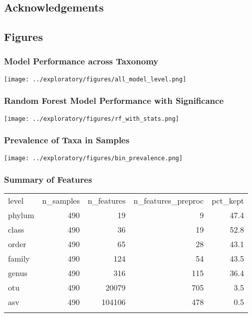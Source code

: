 \documentclass[
]{article}
\begin{document}
\hypertarget{acknowledgements}{%
\subsection{Acknowledgements}\label{acknowledgements}}

\hypertarget{figures}{%
\subsection{Figures}\label{figures}}

\hypertarget{model-performance-across-taxonomy}{%
\subsubsection{Model Performance across
Taxonomy}\label{model-performance-across-taxonomy}}

\texttt{[image: ../exploratory/figures/all\_model\_level.png]}

\hypertarget{random-forest-model-performance-with-significance}{%
\subsubsection{Random Forest Model Performance with
Significance}\label{random-forest-model-performance-with-significance}}

\texttt{[image: ../exploratory/figures/rf\_with\_stats.png]}

\hypertarget{prevalence-of-taxa-in-samples}{%
\subsubsection{Prevalence of Taxa in
Samples}\label{prevalence-of-taxa-in-samples}}

\texttt{[image: ../exploratory/figures/bin\_prevalence.png]}

\hypertarget{summary-of-features}{%
\subsubsection{Summary of Features}\label{summary-of-features}}

\begin{longtable}[]{@{}lrrrr@{}}
\toprule
level & n\_samples & n\_features & n\_features\_preproc &
pct\_kept \\ \addlinespace
\midrule
\endhead
phylum & 490 & 19 & 9 & 47.4 \\ \addlinespace
class & 490 & 36 & 19 & 52.8 \\ \addlinespace
order & 490 & 65 & 28 & 43.1 \\ \addlinespace
family & 490 & 124 & 54 & 43.5 \\ \addlinespace
genus & 490 & 316 & 115 & 36.4 \\ \addlinespace
otu & 490 & 20079 & 705 & 3.5 \\ \addlinespace
asv & 490 & 104106 & 478 & 0.5 \\ \addlinespace
\bottomrule
\end{longtable}
\end{document}
